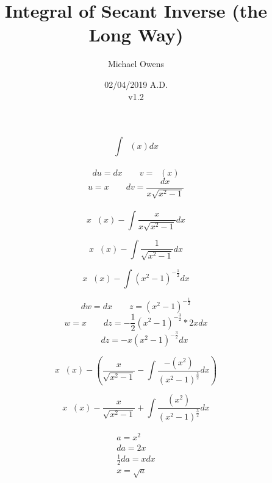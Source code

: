 \documentclass[12pt]{article}
\title{Integral of Secant Inverse (the Long Way)}
\author{Michael Owens}
\date{02/04/2019 A.D.\\v1.2}
\DeclareMathOperator{\seci}{sec^{-1}}
\newcommand{\brek}{\\[1.5em]}
\begin{document}
\maketitle
\thispagestyle{empty}
\clearpage
{}

\begin{center}
\begin{equation}
\int{\seci(x)dx}
\end{equation}
\brek
\begin{equation}
du=dx \qquad  v = \seci (x) 
\end{equation}
\begin{equation}
u=x \qquad dv=\dfrac{dx}{x\sqrt{x^2 - 1}}
\end{equation}
\brek
\begin{equation}
x\seci(x) - \int\dfrac{x}{x\sqrt{x^2 -1}} dx
\end{equation}

\begin{equation}
x\seci(x) - \int\dfrac{1}{\sqrt{x^2 -1}} dx
\end{equation}

\begin{equation}
x\seci(x) - \int{(x^2 -1)^{-\frac{1}{2}}} dx
\end{equation}

\begin{equation}
dw=dx \qquad  z = (x^2 -1)^{-\frac{1}{2}}
\end{equation}
\begin{equation}
w=x \qquad dz=-\frac{1}{2} (x^2 -1)^{-\frac{3}{2}} * 2x dx
\end{equation}
\begin{equation}
\qquad dz=-x(x^2 -1)^{-\frac{3}{2}} dx
\end{equation}

\begin{equation}
x\seci(x) -
\left(\dfrac{x}{\sqrt{x^2 -1}}
- \int{\dfrac{-(x^2)}{(x^2 -1)^{\frac{3}{2}}}} dx\right)
\end{equation}

\begin{equation}
x\seci(x) -
\dfrac{x}{\sqrt{x^2 -1}}
+ \int{\dfrac{(x^2)}{(x^2 -1)^{\frac{3}{2}}}} dx
\end{equation}

\begin{gather}
a=x^2\\
da=2x\\
\frac{1}{2}da = xdx\\
x=\sqrt{a}
\end{gather}


\end{center}
\end{document}
